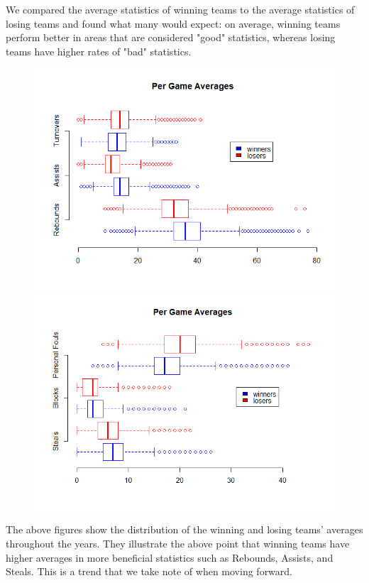 \documentclass[]{scrartcl}
\begin{document}
We compared the average statistics of winning teams to the average statistics of losing teams and found what many would expect: on average, winning teams perform better in areas that are considered "good" statistics, whereas losing teams have higher rates of "bad" statistics.
\begin{figure}[H]
	\begin{center}
	\includegraphics[scale=.4]{GameAverages.png}
	\includegraphics[scale=.4]{GameAverages2.png}
	\end{center}
\end{figure}
The above figures show the distribution of the winning and losing teams' averages throughout the years. They illustrate the above point that winning teams have higher averages in more beneficial statistics such as Rebounds, Assists, and Steals. This is a trend that we take note of when moving forward.
\end{document}

